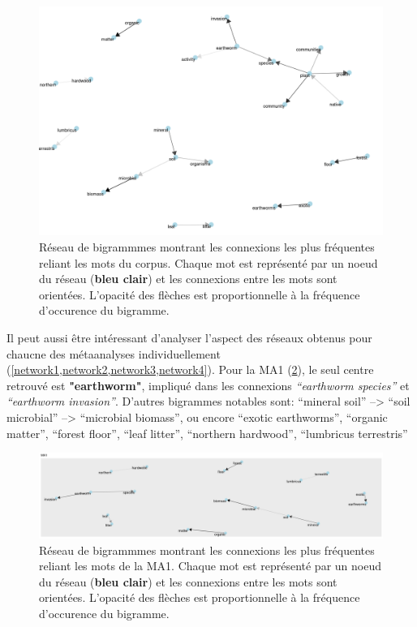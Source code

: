 \documentclass{book}
\begin{document}
\begin{figure}[htb] %
    \begin{center} %
        \includegraphics[width=1\textwidth]{network_all_(oriented).png}
        \caption{Réseau de bigrammmes montrant les connexions les plus fréquentes reliant les mots du corpus. Chaque mot est représenté par un noeud du réseau (\textbf{bleu clair}) et les connexions entre les mots sont orientées. L’opacité des flèches est proportionnelle à la fréquence d’occurence du bigramme.\label{network}}
    \end{center}  
\end{figure}
\FloatBarrier{}


\newpage
Il peut aussi être intéressant d'analyser l'aspect des réseaux obtenus pour chaucne des métaanalyses individuellement (\cref*{network1,network2,network3,network4}). Pour la MA1 (\cref{network1}), le seul centre retrouvé est \textbf{"earthworm"}, impliqué dans les connexions \textit{“earthworm species”} et \textit{ “earthworm invasion”}. D’autres bigrammes notables sont: “mineral soil” –> “soil microbial” –> “microbial biomass”, ou encore “exotic earthworms”, “organic matter”, “forest floor”, “leaf litter”, “northern hardwood”, “lumbricus terrestris”

\begin{figure}[htb] %
    \begin{center} %
        \includegraphics[width=1\textwidth]{network1.png}
        \caption{Réseau de bigrammmes montrant les connexions les plus fréquentes reliant les mots de la MA1. Chaque mot est représenté par un noeud du réseau (\textbf{bleu clair}) et les connexions entre les mots sont orientées. L’opacité des flèches est proportionnelle à la fréquence d’occurence du bigramme.\label{network1}}
    \end{center}  
\end{figure}
\end{document}
